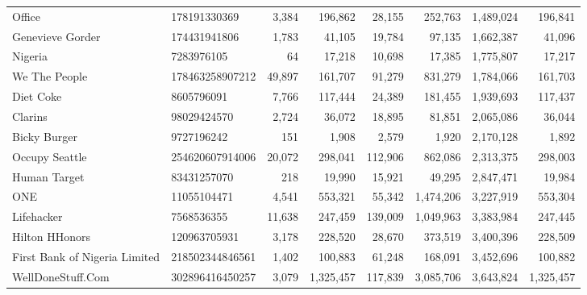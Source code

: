 \begin{longtable}{llrrrrrr}
                                            Office &     178191330369 &   3,384 &     196,862 &     28,155 &     252,763 &   1,489,024 &   196,841 \\
                                  Genevieve Gorder &     174431941806 &   1,783 &      41,105 &     19,784 &      97,135 &   1,662,387 &    41,096 \\
                                           Nigeria &       7283976105 &      64 &      17,218 &     10,698 &      17,385 &   1,775,807 &    17,217 \\
                                     We The People &  178463258907212 &  49,897 &     161,707 &     91,279 &     831,279 &   1,784,066 &   161,703 \\
                                         Diet Coke &       8605796091 &   7,766 &     117,444 &     24,389 &     181,455 &   1,939,693 &   117,437 \\
                                           Clarins &      98029424570 &   2,724 &      36,072 &     18,895 &      81,851 &   2,065,086 &    36,044 \\
                                      Bicky Burger &       9727196242 &     151 &       1,908 &      2,579 &       1,920 &   2,170,128 &     1,892 \\
                                    Occupy Seattle &  254620607914006 &  20,072 &     298,041 &    112,906 &     862,086 &   2,313,375 &   298,003 \\
                                      Human Target &      83431257070 &     218 &      19,990 &     15,921 &      49,295 &   2,847,471 &    19,984 \\
                                               ONE &      11055104471 &   4,541 &     553,321 &     55,342 &   1,474,206 &   3,227,919 &   553,304 \\
                                        Lifehacker &       7568536355 &  11,638 &     247,459 &    139,009 &   1,049,963 &   3,383,984 &   247,445 \\
                                    Hilton HHonors &     120963705931 &   3,178 &     228,520 &     28,670 &     373,519 &   3,400,396 &   228,509 \\
                     First Bank of Nigeria Limited &  218502344846561 &   1,402 &     100,883 &     61,248 &     168,091 &   3,452,696 &   100,882 \\
                                 WellDoneStuff.Com &  302896416450257 &   3,079 &   1,325,457 &    117,839 &   3,085,706 &   3,643,824 & 1,325,457 \\

\end{longtable}
